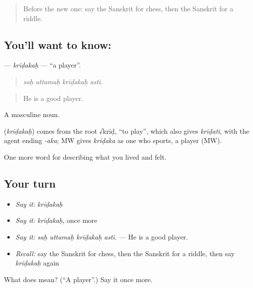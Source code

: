 \begin{quote}
Before the new one: say the Sanskrit for chess, then the Sanskrit for a riddle.
\end{quote}

\subsection*{You'll want to know: }
\textbf{} — \emph{krīḍakaḥ} — \textquotedblleft{}a player\textquotedblright{}.

\begin{quote}
   
\end{quote}

\begin{quote}
\emph{saḥ uttamaḥ krīḍakaḥ asti.}
\end{quote}

\begin{quote}
He is a good player.
\end{quote}

A masculine noun.

\begin{cousinweb}
\textbf{} (\emph{krīḍakaḥ}) comes from the root √krīḍ, \textquotedblleft{}to play\textquotedblright{}, which also gives \emph{krīḍati}, with the agent ending \emph{-aka}; MW gives \emph{krīḍaka} as one who sports, a player (MW).
\end{cousinweb}

\begin{grammarlens}[title={What you've built}]
One more word for describing what you lived and felt.
\end{grammarlens}

\subsection*{Your turn}
\begin{itemize}
\raggedright
  \item \emph{Say it:} \emph{krīḍakaḥ}
  \item \emph{Say it:} \emph{krīḍakaḥ}, once more
  \item \emph{Say it:} \emph{saḥ uttamaḥ krīḍakaḥ asti.} — He is a good player.
  \item \emph{Recall:} say the Sanskrit for chess, then the Sanskrit for a riddle, then say \emph{krīḍakaḥ} again
\end{itemize}

\begin{tcolorbox}[breakable,colback=teal!4,colframe=teal!35!black,title={Before you move on}]
What does  mean? (\textquotedblleft{}A player\textquotedblright{}.) Say it once more.
\end{tcolorbox}
